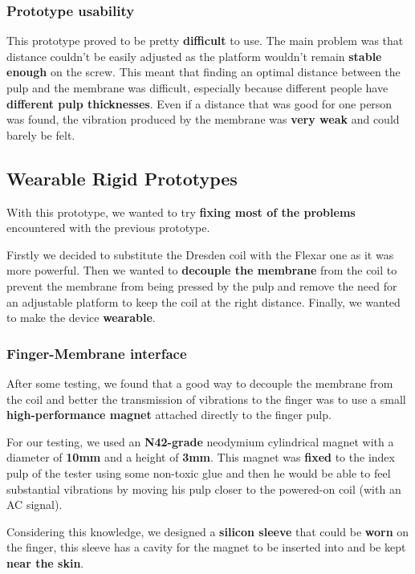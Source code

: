 \subsubsection{Prototype usability}
This prototype proved to be pretty \textbf{difficult} to use.
The main problem was that distance couldn't be easily adjusted as the platform wouldn't remain \textbf{stable enough} on the screw.
This meant that finding an optimal distance between the pulp and the membrane was difficult, especially because different people have \textbf{different pulp thicknesses}.
Even if a distance that was good for one person was found, the vibration produced by the membrane was \textbf{very weak} and could barely be felt.

\subsection{Wearable Rigid Prototypes}
With this prototype, we wanted to try \textbf{fixing most of the problems} encountered with the previous prototype.

Firstly we decided to substitute the Dresden coil with the Flexar one as it was more powerful.
Then we wanted to \textbf{decouple the membrane} from the coil to prevent the membrane from being pressed by the pulp and remove the need for an adjustable platform to keep the coil at the right distance.
Finally, we wanted to make the device \textbf{wearable}.

\subsubsection{Finger-Membrane interface}
After some testing, we found that a good way to decouple the membrane from the coil and better the transmission of vibrations to the finger was to use a small \textbf{high-performance magnet} attached directly to the finger pulp.

For our testing, we used an \textbf{N42-grade} neodymium cylindrical magnet with a diameter of \textbf{10mm} and a height of \textbf{3mm}.
This magnet was \textbf{fixed} to the index pulp of the tester using some non-toxic glue and then he would be able to feel substantial vibrations by moving his pulp closer to the powered-on coil (with an AC signal).

Considering this knowledge, we designed a \textbf{silicon sleeve} that could be \textbf{worn} on the finger, this sleeve has a cavity for the magnet to be inserted into and be kept \textbf{near the skin}.

